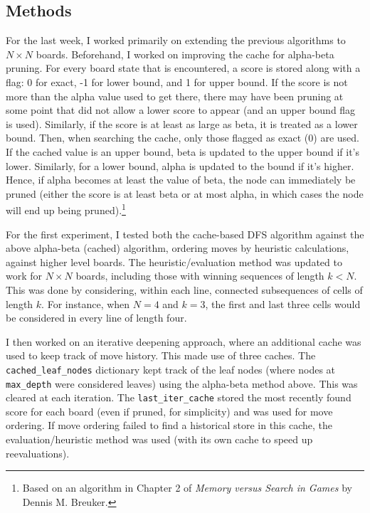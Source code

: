 \subsection{Methods}
For the last week, I worked primarily on extending the previous algorithms to \(N\times N\) boards. Beforehand, I worked on improving the cache for alpha-beta pruning. For every board state that is encountered, a score is stored along with a flag: 0 for exact, -1 for lower bound, and 1 for upper bound. If the score is not more than the alpha value used to get there, there may have been pruning at some point that did not allow a lower score to appear (and an upper bound flag is used). Similarly, if the score is at least as large as beta, it is treated as a lower bound. Then, when searching the cache, only those flagged as exact (0) are used. If the cached value is an upper bound, beta is updated to the upper bound if it's lower. Similarly, for a lower bound, alpha is updated to the bound if it's higher. Hence, if alpha becomes at least the value of beta, the node can immediately be pruned (either the score is at least beta or at most alpha, in which cases the node will end up being pruned).\footnote{Based on an algorithm in Chapter 2 of \textit{Memory versus Search in Games} by Dennis M. Breuker.}

For the first experiment, I tested both the cache-based DFS algorithm against the above alpha-beta (cached) algorithm, ordering moves by heuristic calculations, against higher level boards. The heuristic/evaluation method was updated to work for \(N\times N\) boards, including those with winning sequences of length \(k<N\). This was done by considering, within each line, connected subsequences of cells of length \(k\). For instance, when \(N=4\) and \(k=3\), the first and last three cells would be considered in every line of length four.

I then worked on an iterative deepening approach, where an additional cache was used to keep track of move history. This made use of three caches. The \texttt{cached\_leaf\_nodes} dictionary kept track of the leaf nodes (where nodes at \texttt{max\_depth} were considered leaves) using the alpha-beta method above. This was cleared at each iteration. The \texttt{last\_iter\_cache} stored the most recently found score for each board (even if pruned, for simplicity) and was used for move ordering. If move ordering failed to find a historical store in this cache, the evaluation/heuristic method was used (with its own cache to speed up reevaluations).

